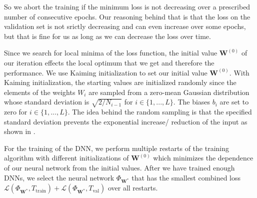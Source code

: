 So we abort the training if the minimum loss is not decreasing over a prescribed number of consecutive epochs. Our reasoning behind that is that the loss on the validation set is not srictly decreasing and can even increase over some epochs, but that is fine for us as long as we can decrease the loss over time.

Since we search for local minima of the loss function, the initial value $\mathbf{W}^{(0)}$ of our iteration effects the local optimum that we get and therefore the performance. We use Kaiming initialization \cite{7410480} to set our initial value $\mathbf{W}^{(0)}$. With Kaiming initialization, the starting values are initialized randomly since the elements of the weights $W_i$ are sampled from a zero-mean Gaussian distribution whose standard deviation is $\sqrt{2/N_{i-1}}$ for $i\in\{1,...,L\}$. The biases $b_i$ are set to zero for $i\in\{1,...,L\}$. The idea behind the random sampling is that the specified standard deviation prevents the exponential increase/ reduction of the input as shown in \cite{7410480}.

For the training of the DNN, we perform multiple restarts of the training algorithm with different initializations of $\mathbf{W}^{(0)}$ which minimizes the dependence of our neural network from the initial values. After we have trained enough DNNs, we select the neural network $\Phi_{\mathbf{W}^*}$ that has the smallest combined loss $\mathscr{L}(\Phi_{\mathbf{W}^*},T_\mathrm{train})+\mathscr{L}(\Phi_{\mathbf{W}^*},T_\mathrm{val})$ over all restarts.

